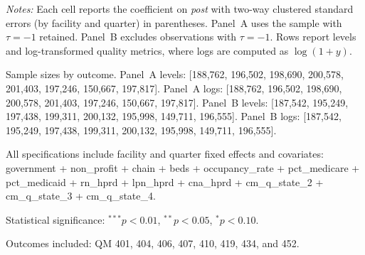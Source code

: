 \documentclass[11pt]{article}
\begin{document}
\begin{table}[!ht]
\begin{threeparttable}
\begin{tablenotes}[flushleft]
\footnotesize
\item \textit{Notes:} Each cell reports the coefficient on \textit{post} with two-way clustered standard errors (by facility and quarter) in parentheses. Panel~A uses the sample with $\tau=-1$ retained. Panel~B excludes observations with $\tau=-1$. Rows report levels and log-transformed quality metrics, where logs are computed as $\log(1+y)$.
\item Sample sizes by outcome. Panel~A levels: [188,762, 196,502, 198,690, 200,578, 201,403, 197,246, 150,667, 197,817]. Panel~A logs: [188,762, 196,502, 198,690, 200,578, 201,403, 197,246, 150,667, 197,817]. Panel~B levels: [187,542, 195,249, 197,438, 199,311, 200,132, 195,998, 149,711, 196,555]. Panel~B logs: [187,542, 195,249, 197,438, 199,311, 200,132, 195,998, 149,711, 196,555].
\item All specifications include facility and quarter fixed effects and covariates: government + non\_profit + chain + beds + occupancy\_rate + pct\_medicare + pct\_medicaid + rn\_hprd + lpn\_hprd + cna\_hprd + cm\_q\_state\_2 + cm\_q\_state\_3 + cm\_q\_state\_4.
\item Statistical significance: $^{***}p<0.01$, $^{**}p<0.05$, $^{*}p<0.10$.
\item Outcomes included: QM 401, 404, 406, 407, 410, 419, 434, and 452.
\end{tablenotes}
\end{threeparttable}
\end{table}
\endgroup
\end{document}
